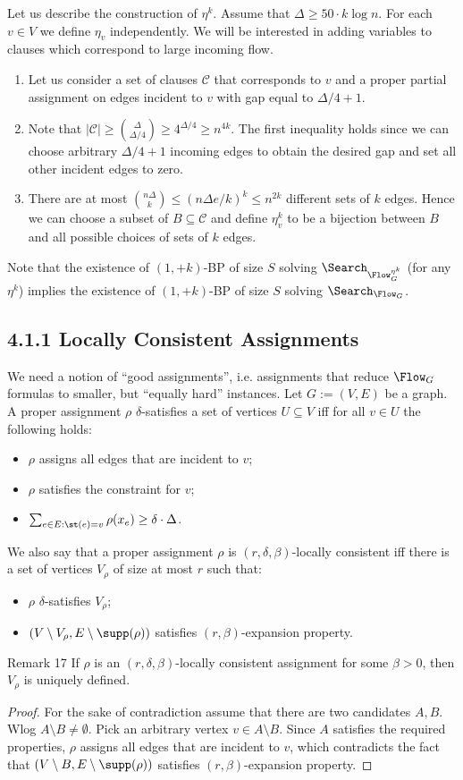 Let us describe the construction of $\eta^k$. Assume that $\Delta\ge50\cdot k\log n$. For each $v\in V$ we define $\eta_v$ independently. We will be interested in adding variables to clauses which correspond to large incoming flow.
\begin{enumerate}
\item Let us consider a set of clauses $\mathcal C$ that corresponds to $v$ and a proper partial assignment on edges incident to $v$ with gap equal to $\Delta/4+1$.
\item Note that $|\mathcal C|\ge\binom{\Delta}{\Delta/4}\ge4^{\Delta/4}\ge n^{4k}$. The first inequality holds since we can choose arbitrary $\Delta/4+1$ incoming edges to obtain the desired gap and set all other incident edges to zero.
\item There are at most $\binom{n\Delta}{k}\le(n\Delta e/k)^k\le n^{2k}$ different sets of $k$ edges. Hence we can choose a subset of $B\subseteq\mathcal C$ and define $\eta_v^k$ to be a bijection between $B$ and all possible choices of sets of $k$ edges.
\end{enumerate}
Note that the existence of $(1,+k)$-BP of size $S$ solving $\Search_{\Flow_G^{\eta^k}}$ (for any $\eta^k$) implies the existence of $(1,+k)$-BP of size $S$ solving $\Search_{\Flow_G}$.
\subsection*{4.1.1 Locally Consistent Assignments}
We need a notion of ``good assignments'', i.e. assignments that reduce $\Flow_G$ formulas to smaller, but ``equally hard'' instances.
Let $G:=(V,E)$ be a graph. A proper assignment $\rho$ $\delta$-satisfies a set of vertices $U\subseteq V$ iff for all $v\in U$ the following holds:
\begin{itemize}\item $\rho$ assigns all edges that are incident to $v$;
\item $\rho$ satisfies the constraint for $v$;
\item $\sum_{e\in E:\st(e)=v}\rho(x_e)\ge\delta\cdot\Delta$.\end{itemize}
We also say that a proper assignment $\rho$ is $(r,\delta,\beta)$-locally consistent iff there is a set of vertices $V_\rho$ of size at most $r$ such that:
\begin{itemize}\item $\rho$ $\delta$-satisfies $V_\rho$;
\item $(V\setminus V_\rho,E\setminus\supp(\rho))$ satisfies $(r,\beta)$-expansion property.\end{itemize}
\begin{result}{Remark 17}
If $\rho$ is an $(r,\delta,\beta)$-locally consistent assignment for some $\beta>0$, then $V_\rho$ is uniquely defined.
\end{result}
\begin{proof}
For the sake of contradiction assume that there are two candidates $A,B$. Wlog $A\setminus B\ne\emptyset$. Pick an arbitrary vertex $v\in A\setminus B$. Since $A$ satisfies the required properties, $\rho$ assigns all edges that are incident to $v$, which contradicts the fact that $(V\setminus B,E\setminus\supp(\rho))$ satisfies $(r,\beta)$-expansion property.
\end{proof}

